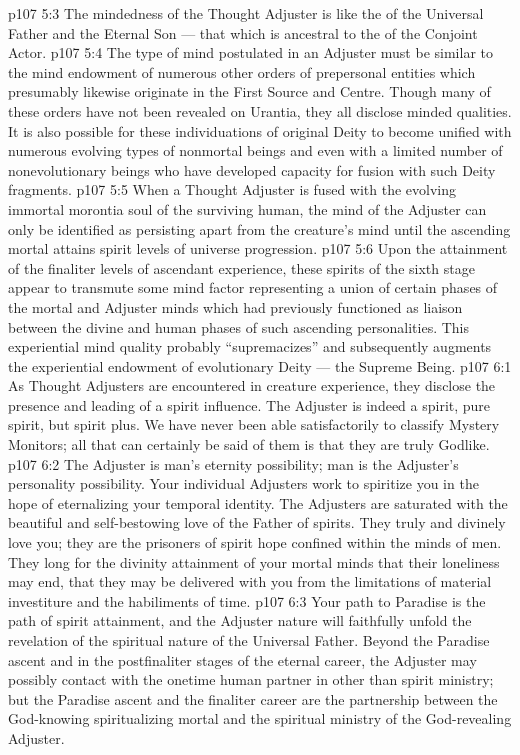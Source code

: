 \vs p107 5:3 The mindedness of the Thought Adjuster is like the  of the Universal Father and the Eternal Son --- that which is ancestral to the  of the Conjoint Actor.
\vs p107 5:4 The type of mind postulated in an Adjuster must be similar to the mind endowment of numerous other orders of prepersonal entities which presumably likewise originate in the First Source and Centre. Though many of these orders have not been revealed on Urantia, they all disclose minded qualities. It is also possible for these individuations of original Deity to become unified with numerous evolving types of nonmortal beings and even with a limited number of nonevolutionary beings who have developed capacity for fusion with such Deity fragments.
\vs p107 5:5 When a Thought Adjuster is fused with the evolving immortal morontia soul of the surviving human, the mind of the Adjuster can only be identified as persisting apart from the creature’s mind until the ascending mortal attains spirit levels of universe progression.
\vs p107 5:6 Upon the attainment of the finaliter levels of ascendant experience, these spirits of the sixth stage appear to transmute some mind factor representing a union of certain phases of the mortal and Adjuster minds which had previously functioned as liaison between the divine and human phases of such ascending personalities. This experiential mind quality probably “supremacizes” and subsequently augments the experiential endowment of evolutionary Deity --- the Supreme Being.
\vs p107 6:1 As Thought Adjusters are encountered in creature experience, they disclose the presence and leading of a spirit influence. The Adjuster is indeed a spirit, pure spirit, but spirit plus. We have never been able satisfactorily to classify Mystery Monitors; all that can certainly be said of them is that they are truly Godlike.
\vs p107 6:2 The Adjuster is man’s eternity possibility; man is the Adjuster’s personality possibility. Your individual Adjusters work to spiritize you in the hope of eternalizing your temporal identity. The Adjusters are saturated with the beautiful and self\hyp{}bestowing love of the Father of spirits. They truly and divinely love you; they are the prisoners of spirit hope confined within the minds of men. They long for the divinity attainment of your mortal minds that their loneliness may end, that they may be delivered with you from the limitations of material investiture and the habiliments of time.
\vs p107 6:3 Your path to Paradise is the path of spirit attainment, and the Adjuster nature will faithfully unfold the revelation of the spiritual nature of the Universal Father. Beyond the Paradise ascent and in the postfinaliter stages of the eternal career, the Adjuster may possibly contact with the onetime human partner in other than spirit ministry; but the Paradise ascent and the finaliter career are the partnership between the God\hyp{}knowing spiritualizing mortal and the spiritual ministry of the God\hyp{}revealing Adjuster.
